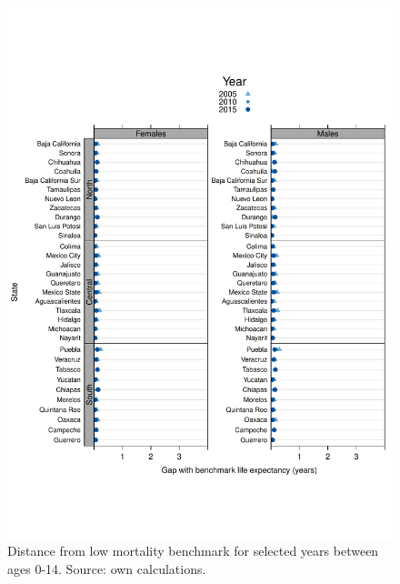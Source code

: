 \documentclass[11.5pt]{article}
\begin{document}
{\begin{figure}
\centering
\caption{Distance from low mortality benchmark for selected years between ages 0-14. Source: own calculations.}
\begin{center}
\includegraphics[scale=.5]{Distance_y.pdf}
\end{center}
\end{figure}

}
\end{document}
